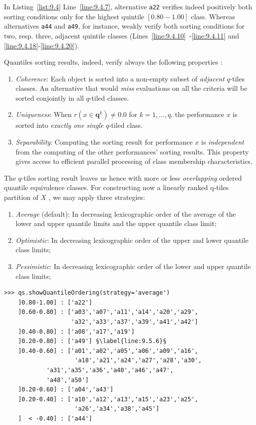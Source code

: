 In Listing~\vref{list:9.4} Line~\ref{line:9.4.7}, alternative \texttt{a22} verifies indeed positively both sorting conditions only for the highest quintile $[0.80 - 1.00]$ class. Whereas alternatives \texttt{a44} and \texttt{a49}, for instance, weakly verify both sorting conditions for two, resp. three, adjacent quintile classes (Lines~\ref{line:9.4.10}~-\ref{line:9.4.11} and \ref{line:9.4.18}-\ref{line:9.4.20}).  

Quantiles sorting results, indeed, verify always the following properties \citep{ADT-L10}:
\begin{property}\label{prop:9.1}
\begin{enumerate}[leftmargin=0.5cm,rightmargin=0.5cm,topsep=1pt]
\item \emph{Coherence}: Each object is sorted into a non-empty subset of \emph{adjacent} $q$-tiles classes. An alternative that would \emph{miss} evaluations on all the criteria will be sorted conjointly in all $q$-tiled classes.
\item \emph{Uniqueness}: When $r(x \in \mathbf{q}^k) \neq 0.0$  for $k = 1, ..., q$, the performance $x$ is sorted into \emph{exactly one single} $q$-tiled class.
\item \emph{Separability}: Computing the sorting result for performance $x$ is \emph{independent} from the computing of the other performances’ sorting results. This property gives access to efficient parallel processing of class membership characteristics.
\end{enumerate}
\end{property}

The $q$-tiles sorting result leaves us hence with more or less \emph{overlapping} ordered quantile equivalence classes. For constructing now a linearly ranked q-tiles partition of $X$ , we may apply three strategies:
\begin{enumerate}[leftmargin=0.5cm,rightmargin=0.5cm,topsep=1pt]
\item \emph{Average} (default): In decreasing lexicographic order of the average of the lower and upper quantile limits and the upper quantile class limit;
\item \emph{Optimistic}: In decreasing lexicographic order of the upper and lower quantile class limits;
\item \emph{Pessimistic}: In decreasing lexicographic order of the lower and upper quantile class limits;
\end{enumerate}
\begin{lstlisting}[caption={Weakly ranking the quintiles sorting result},label=list:9.5]
>>> qs.showQuantileOrdering(strategy='average')
    ]0.80-1.00] : ['a22']
    ]0.60-0.80] : ['a03','a07','a11','a14','a20','a29',
                   'a32','a33','a37','a39','a41','a42']
    ]0.40-0.80] : ['a08','a17','a19']
    ]0.20-0.80] : ['a49'] §\label{line:9.5.6}§
    ]0.40-0.60] : ['a01','a02','a05','a06','a09','a16',
                    'a18','a21','a24','a27','a28','a30',
		    'a31','a35','a36','a40','a46','a47',
		    'a48','a50']
    ]0.20-0.60] : ['a04','a43']
    ]0.20-0.40] : ['a10','a12','a13','a15','a23','a25',
                    'a26','a34','a38','a45']
    ]  < -0.40] : ['a44']
\end{lstlisting}

